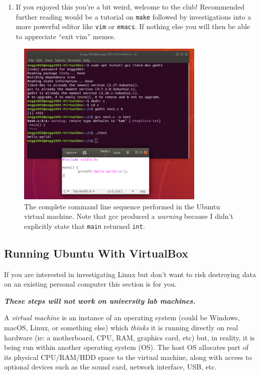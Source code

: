\documentclass{lab}
\begin{document}
\begin{enumerate}
\item If you enjoyed this you're a bit weird, welcome to the club! Recommended further reading would be a tutorial on \texttt{make} followed by investigations into a more powerful editor like \texttt{vim} or \texttt{emacs}. If nothing else you will then be able to appreciate ``exit vim'' memes.
\end{enumerate}

\begin{figure}[H]
\begin{center}
\includegraphics[width=0.8\textwidth]{Wk1Images/c_ubuntu.png}
\end{center}
\caption{The complete command line sequence performed in the Ubuntu virtual machine. Note that gcc produced a \textit{warning} because I didn't explicitly state that \texttt{main} returned \texttt{int}.}\label{fig:c_ubuntu}
\end{figure}

\pagebreak
\subsection{Running Ubuntu With VirtualBox}\label{sec:virtualbox}

If you are interested in investigating Linux but don't want to risk destroying data on an existing personal computer this section is for you.

\textbf{\textit{These steps will not work on university lab machines.}}

A \textit{virtual machine} is an instance of an operating system (could be Windows, macOS, Linux, or something else) which \textit{thinks} it is running directly on real hardware (ie: a motherboard, CPU, RAM, graphics card, etc) but, in reality, it is being run within another operating system (OS). The host OS allocates part of its physical CPU/RAM/HDD space to the virtual machine, along with access to optional devices such as the sound card, network interface, USB, etc.
\end{document}
